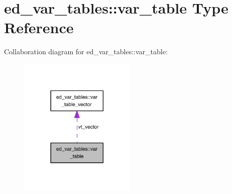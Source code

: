 \hypertarget{structed__var__tables_1_1var__table}{}\section{ed\+\_\+var\+\_\+tables\+:\+:var\+\_\+table Type Reference}
\label{structed__var__tables_1_1var__table}


Collaboration diagram for ed\+\_\+var\+\_\+tables\+:\+:var\+\_\+table\+:
\nopagebreak
\begin{figure}[H]
\begin{center}
\leavevmode
\includegraphics[width=158pt]{structed__var__tables_1_1var__table__coll__graph}
\end{center}
\end{figure}
